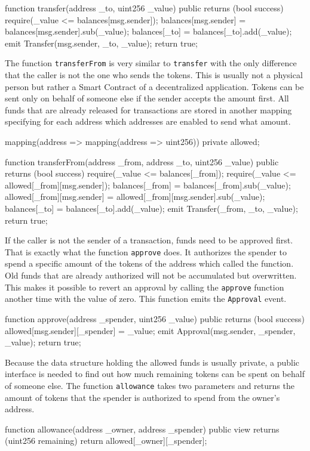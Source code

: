 \begin{GenericCode}
function transfer(address _to, uint256 _value) public returns (bool success) {
  require(_value <= balances[msg.sender]);
  balances[msg.sender] = balances[msg.sender].sub(_value);
  balances[_to] = balances[_to].add(_value);
  emit Transfer(msg.sender, _to, _value);
  return true;
}
\end{GenericCode}

The function \texttt{transferFrom} is very similar to \texttt{transfer} with the only difference that the caller is not the one who sends the tokens. This is usually not a physical person but rather a Smart Contract of a decentralized application. Tokens can be sent only on behalf of someone else if the sender accepts the amount first. All funds that are already released for transactions are stored in another mapping specifying for each address which addresses are enabled to send what amount.

\begin{GenericCode}
mapping(address => mapping(address => uint256)) private allowed;

function transferFrom(address _from, address _to, uint256 _value) public returns (bool success) {
  require(_value <= balances[_from]);
  require(_value <= allowed[_from][msg.sender]);
  balances[_from] = balances[_from].sub(_value);
  allowed[_from][msg.sender] = allowed[_from][msg.sender].sub(_value);
  balances[_to] = balances[_to].add(_value);
  emit Transfer(_from, _to, _value);
  return true;
}
\end{GenericCode}

If the caller is not the sender of a transaction, funds need to be approved first. That is exactly what the function \texttt{approve} does. It authorizes the spender to spend a specific amount of the tokens of the address which called the function. Old funds that are already authorized will not be accumulated but overwritten. This makes it possible to revert an approval by calling the \texttt{approve} function another time with the value of zero. This function emits the \texttt{Approval} event.
\begin{GenericCode}
function approve(address _spender, uint256 _value) public returns (bool success) {
  allowed[msg.sender][_spender] = _value;
  emit Approval(msg.sender, _spender, _value);
  return true;
}
\end{GenericCode}

Because the data structure holding the allowed funds is usually private, a public interface is needed to find out how much remaining tokens can be spent on behalf of someone else. The function \texttt{allowance} takes two parameters and returns the amount of tokens that the spender is authorized to spend from the owner's address.
\begin{GenericCode}
function allowance(address _owner, address _spender) public view returns (uint256 remaining) {
  return allowed[_owner][_spender];
}
\end{GenericCode}

